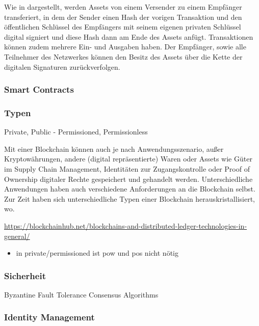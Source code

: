 	    Wie in  dargestellt, werden Assets von einem Versender zu einem Empfänger transferiert, in dem der Sender einen Hash der vorigen Transaktion und den öffentlichen Schlüssel des Empfängers mit seinem eigenen privaten Schlüssel digital signiert und diese Hash dann am Ende des Assets anfügt.
	    Transaktionen können zudem mehrere Ein- und Ausgaben haben\cite{Nakamoto2008}.
	    Der Empfänger, sowie alle Teilnehmer des Netzwerkes können den Besitz des Assets über die Kette der digitalen Signaturen zurückverfolgen\cite{Nakamoto2008}.
    
    \begin{figure}[H]
    \end{figure}
    
    \subsubsection{Smart Contracts}
    
    \subsubsection{Typen}
        Private, Public - Permissioned, Permissionless
        
        Mit einer Blockchain können auch je nach Anwendungsszenario, außer Kryptowährungen, andere (digital repräsentierte) Waren oder Assets wie Güter im Supply Chain Management\cite{Underwood2016}, Identitäten zur Zugangskontrolle\cite{Kshetri2017} oder Proof of Ownership digitaler Rechte\cite{Wuest2017} gespeichert und gehandelt werden. 
        Unterschiedliche Anwendungen haben auch verschiedene Anforderungen an die Blockchain selbst. 
        Zur Zeit haben sich unterschiedliche Typen einer Blockchain herauskristallisiert, wo.
        
        
        {\sloppy\url{https://blockchainhub.net/blockchains-and-distributed-ledger-technologies-in-general/}}
        \begin{itemize}[noitemsep]
            \item in private/\-permissioned ist \gls{pow} und \gls{pos} nicht nötig
        \end{itemize}
    
    \subsubsection{Sicherheit}
    \label{sec:sota_blockchain_security}
        Byzantine Fault Tolerance
        Consensus Algorithms
    
    \subsubsection{Identity Management}
    \label{sec:sota_blockchain_identitymgmnt}
